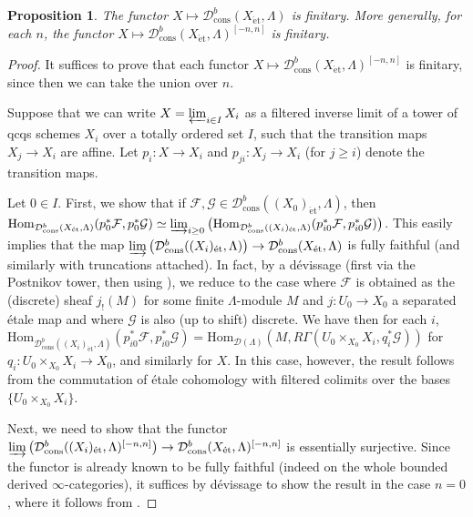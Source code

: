 \documentclass[reqno]{amsart}
\newcommand{\sF}{\mathcal{F}}
\newcommand{\et}{\mathrm{\acute{e}t}}
\renewcommand{\hom}{\mathrm{Hom}}
\newcommand{\D}{\mathcal{D}}
\newtheorem{proposition}[theorem]{Proposition}
\theoremstyle{definition}
\begin{document}
\newcommand{\sG}{\mathcal{G}}
\begin{proposition} 
\label{dboundedvsheaf}
The functor $X \mapsto \D^b_{\mathrm{cons}}(X_{\et}, \Lambda)$ is finitary. 
More generally, for each $n$, the functor $X \mapsto \D^b_{\mathrm{cons}}(X_{\et}, \Lambda)^{[-n, n]}$
is finitary.  
\end{proposition} 
\begin{proof} 
It suffices to prove that each 
functor $X \mapsto \D^b_{\mathrm{cons}}(X_{\et}, \Lambda)^{[-n, n]}$ is
finitary, since then we can take the union over $n$. 

Suppose that we can write $X = \varprojlim_{i \in I} X_i$ 
as a filtered inverse limit of a tower of qcqs schemes $X_i$ over a totally
ordered set $I$, such that the transition maps $X_j \to X_i$ are affine. 
Let $p_i\colon  X \to X_i$ and $p_{ji}\colon  X_j \to X_i$ (for $j \geq i$) denote the
transition maps. 

Let $0 \in I$. 
First, we show that if $\sF, \sG \in \D^b_{\mathrm{cons}}((X_0)_{\et}, \Lambda)$, then 
$\hom_{\D^b_{\mathrm{cons}}( X_{\et}, \Lambda)}( p_0^* \sF, p_0^* \sG)  
\simeq \varinjlim_{i \geq 0} \left( \hom_{\D^b_{\mathrm{cons}}( (X_i)_{\et},
\Lambda)}( p_{i0}^* \sF, p_{i0}^* \sG) \right)
$. This easily implies that the map 
$\varinjlim  \left( \D^b_{\mathrm{cons}}( (X_i)_{\et}, \Lambda) \right) \to \D^b_{\mathrm{cons}}( X_{\et}, \Lambda)$ is fully
faithful (and similarly with truncations attached). 
In fact, by a d\'evissage (first via the Postnikov tower, then using \cite[Tag
095M]{stacks-project}),
we reduce to the case where $\sF$ is obtained as the (discrete) sheaf
$j_!(M)$ for some finite $\Lambda$-module $M$ and $j\colon  U_0 \to X_0$ a separated
\'etale map and where $\sG$ is also (up to shift) discrete. 
We have then 
for each $i$,
$ \hom_{\D^b_{\mathrm{cons}}( (X_i)_{\et},
\Lambda)}( p_{i0}^* \sF, p_{i0}^* \sG) 
= 
\hom_{\D(\Lambda)}(M,  R \Gamma(U_0 \times_{X_0} X_i, q_i^* \mathcal{G}) )$
for $q_i \colon
U_0 \times_{X_0} X_i \to X_0$, and similarly for $X$. 
In this case, however, the result follows from the commutation of
\'etale cohomology with filtered colimits over the bases $\{U_0 \times_{X_0}
X_i\}$. 


Next, we need to show that 
the functor
$\varinjlim  \left( \D^b_{\mathrm{cons}}( (X_i)_{\et}, \Lambda)^{[-n, n]}
\right) \to \D^b_{\mathrm{cons}}( X_{\et},
\Lambda)^{[-n, n]}$
is essentially surjective. Since the functor is already known to be fully faithful (indeed on the
whole bounded derived $\infty$-categories), it suffices by
d\'evissage to show the result in the case $n = 0$, where it follows from 
\cite[Tag 09YU]{stacks-project}. 
\end{proof} 
\end{document}

